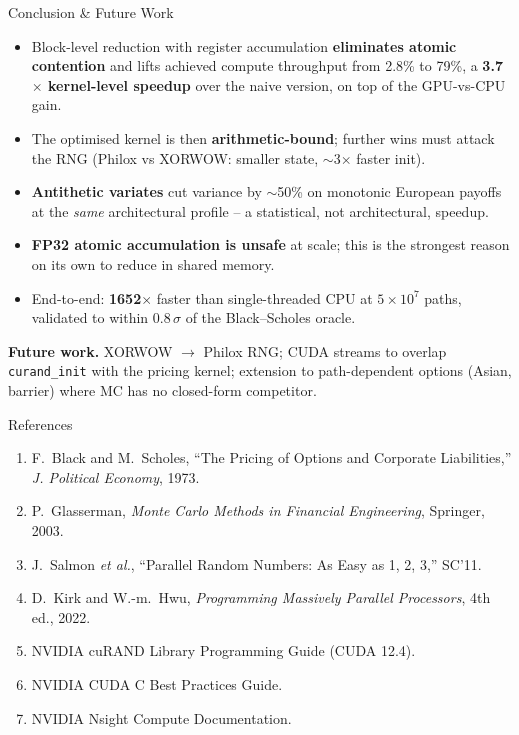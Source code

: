 \documentclass[portrait,a0b,final]{a0poster}
\begin{document}
\begin{minipage}[t]{0.315\textwidth}
\begin{posterblock}{Conclusion \& Future Work}
\begin{itemize}
\item Block-level reduction with register accumulation
      \textbf{eliminates atomic contention} and lifts achieved
      compute throughput from 2.8\% to 79\%, a
      \textbf{3.7$\times$ kernel-level speedup} over the naive
      version, on top of the GPU-vs-CPU gain.
\item The optimised kernel is then \textbf{arithmetic-bound};
      further wins must attack the RNG (Philox vs XORWOW: smaller
      state, $\sim$3$\times$ faster init).
\item \textbf{Antithetic variates} cut variance by $\sim$50\% on
      monotonic European payoffs at the \emph{same} architectural
      profile -- a statistical, not architectural, speedup.
\item \textbf{FP32 atomic accumulation is unsafe} at scale; this is
      the strongest reason on its own to reduce in shared memory.
\item End-to-end: \textbf{1652$\times$} faster than single-threaded
      CPU at $5\!\times\!10^{7}$ paths, validated to within 0.8\,$\sigma$
      of the Black--Scholes oracle.
\end{itemize}
\textbf{Future work.} XORWOW $\rightarrow$ Philox RNG; CUDA streams
to overlap \texttt{curand\_init} with the pricing kernel; extension
to path-dependent options (Asian, barrier) where MC has no
closed-form competitor.
\end{posterblock}

\begin{posterblock}{References}
\footnotesize
\begin{enumerate}
\item F.~Black and M.~Scholes, ``The Pricing of Options and Corporate
      Liabilities,'' \emph{J. Political Economy}, 1973.
\item P.~Glasserman, \emph{Monte Carlo Methods in Financial
      Engineering}, Springer, 2003.
\item J.~Salmon \emph{et al.}, ``Parallel Random Numbers: As Easy as
      1, 2, 3,'' SC'11.
\item D.~Kirk and W.-m.~Hwu, \emph{Programming Massively Parallel
      Processors}, 4th ed., 2022.
\item NVIDIA cuRAND Library Programming Guide (CUDA 12.4).
\item NVIDIA CUDA C Best Practices Guide.
\item NVIDIA Nsight Compute Documentation.
\end{enumerate}
\end{posterblock}

\end{minipage}
\end{document}
